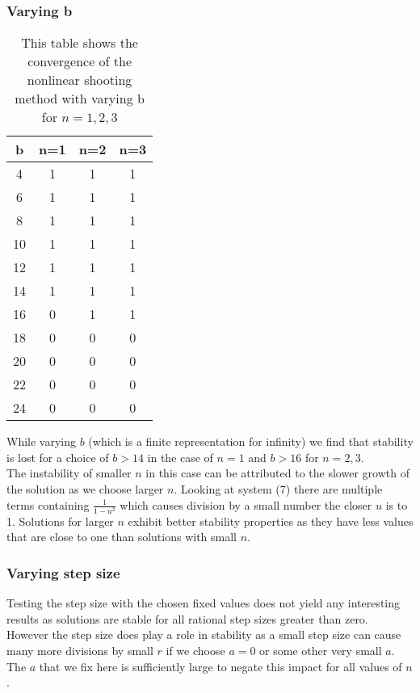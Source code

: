 \documentclass{article}
\begin{document}
\subsubsection{Varying b}
\begin{table}[H]
\centering
\begin{tabular}{|c|c|c|c|}
\hline
b & n=1 & n=2 & n=3   \\
\hline
4  & 1 & 1 & 1\\
6  & 1 & 1 & 1\\
8  & 1 & 1 & 1\\
10 & 1 & 1 & 1\\
12 & 1 & 1 & 1\\
14 & 1 & 1 & 1\\
16 & 0 & 1 & 1\\
18 & 0 & 0 & 0\\
20 & 0 & 0 & 0\\
22 & 0 & 0 & 0\\
24 & 0 & 0 & 0\\
\hline
\end{tabular}
\caption{This table shows the convergence of the nonlinear shooting method with varying b for $n=1,2,3$}
\end{table}
While varying $b$ (which is a finite representation for infinity) we find that stability is lost for a choice of $b > 14$ in the case of $n=1$ and $b>16$ for $n=2,3$. \\
The instability of smaller $n$ in this case can be attributed to the slower growth of the solution as we choose larger $n$. Looking at system (7) there are multiple terms containing $\frac{1}{1-u^2}$ which causes division by a small number the closer $u$ is to 1. Solutions for larger $n$ exhibit better stability properties as they have less values that are close to one than solutions with small $n$. 
\subsubsection{Varying step size}
Testing the step size with the chosen fixed values does not yield any interesting results as solutions are stable for all rational step sizes greater than zero. \\
However the step size does play a role in stability as a small step size can cause many more divisions by small $r$ if we choose $a=0$ or some other very small $a$. The $a$ that we fix here is sufficiently large to negate this impact for all values of $n$. 
\end{document}
